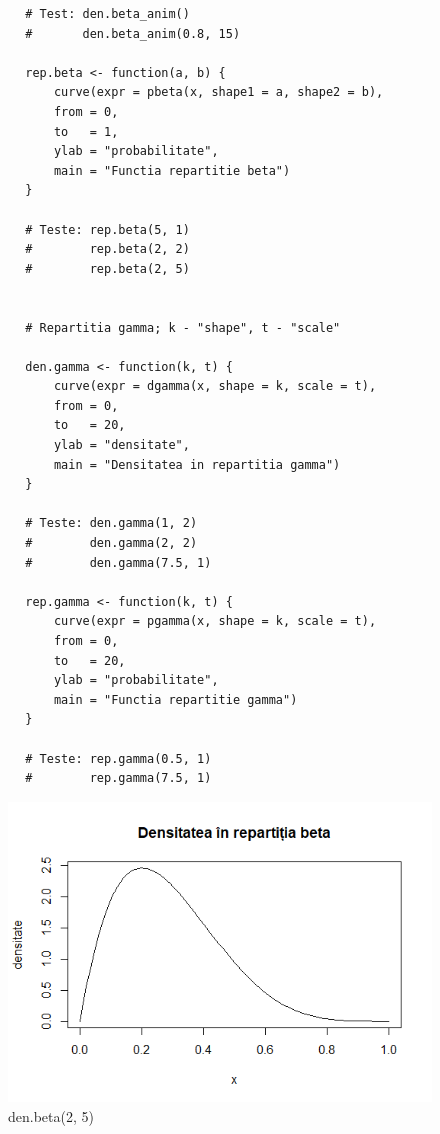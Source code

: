 \documentclass[12pt]{article}
\begin{document}
\begin{lstlisting}
		# Test: den.beta_anim()
		#       den.beta_anim(0.8, 15)
		
		rep.beta <- function(a, b) {
			curve(expr = pbeta(x, shape1 = a, shape2 = b),
			from = 0,
			to   = 1,
			ylab = "probabilitate",
			main = "Functia repartitie beta")
		}
		
		# Teste: rep.beta(5, 1)
		#        rep.beta(2, 2)
		#        rep.beta(2, 5)
		
		
		# Repartitia gamma; k - "shape", t - "scale"
		
		den.gamma <- function(k, t) {
			curve(expr = dgamma(x, shape = k, scale = t),
			from = 0,
			to   = 20,
			ylab = "densitate",
			main = "Densitatea in repartitia gamma")
		}
		
		# Teste: den.gamma(1, 2)
		#        den.gamma(2, 2)
		#        den.gamma(7.5, 1)
		
		rep.gamma <- function(k, t) {
			curve(expr = pgamma(x, shape = k, scale = t),
			from = 0,
			to   = 20,
			ylab = "probabilitate",
			main = "Functia repartitie gamma")
		}
		
		# Teste: rep.gamma(0.5, 1)
		#        rep.gamma(7.5, 1)
	\end{lstlisting}
	\begin{figure}[h!]
		\centering
		\includegraphics[scale=0.75]{DenBeta}
		\caption{den.beta(2, 5)}
	\end{figure}
\end{document}
